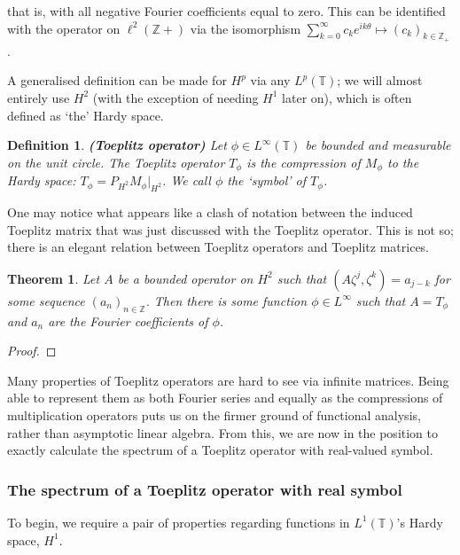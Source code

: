\documentclass{article}
\newcommand{\1}{\mathbf{1}}
\newtheorem{definition}{Definition}[section]
\newtheorem{theorem}{Theorem}[section]
\begin{document}
that is, with all negative Fourier coefficients equal to zero. This can be identified with the operator on $\ell^2(\mathbb{Z}+)$ via the isomorphism $\sum_{k=0}^\infty c_k e^{i k \theta} \mapsto (c_k)_{k \in \mathbb{Z}_+}$ \parencite{bottcher2006analysis}.

 A generalised definition can be made for $H^p$ via any $L^p(\mathbb{T})$; we will almost entirely use $H^2$ (with the exception of needing $H^1$ later on), which is often defined as `the' Hardy space.

\begin{definition}{\textbf{(Toeplitz operator)}}
Let $\phi \in L^{\infty}(\mathbb{T})$ be bounded and measurable on the unit circle. The Toeplitz operator $T_\phi$ is the compression of $M_\phi$ 
to the Hardy space: $T_{\phi} = P_{H^2} M_\phi \big|_{H^2}$. We call $\phi$ the `symbol' of $T_\phi$.
\end{definition}

One may notice what appears like a clash of notation between the induced Toeplitz matrix that was just discussed with the Toeplitz operator. This is not
so; there is an elegant relation between Toeplitz operators and Toeplitz matrices.

\begin{theorem}
Let $A$ be a bounded operator on $H^2$ such that $(A \zeta^j, \zeta^k) = a_{j-k}$ for some sequence $(a_n)_{n \in \mathbb{Z}}$. Then there is
some function $\phi \in L^\infty$ such that $A = T_\phi$ and $a_n$ are the Fourier coefficients of $\phi$.
\end{theorem}
\begin{proof}
\end{proof}

Many properties of Toeplitz operators are hard to see via infinite matrices. Being able to represent them as both Fourier series and equally as the  
compressions of multiplication operators puts us on the firmer ground of functional analysis, rather than asymptotic linear algebra. From this, we
are now in the position to exactly calculate the spectrum of a Toeplitz operator with real-valued symbol.

\subsubsection{The spectrum of a Toeplitz operator with real symbol}

To begin, we require a pair of properties regarding functions in $L^1(\mathbb{T})$'s Hardy space, $H^1$. 
\end{document}

